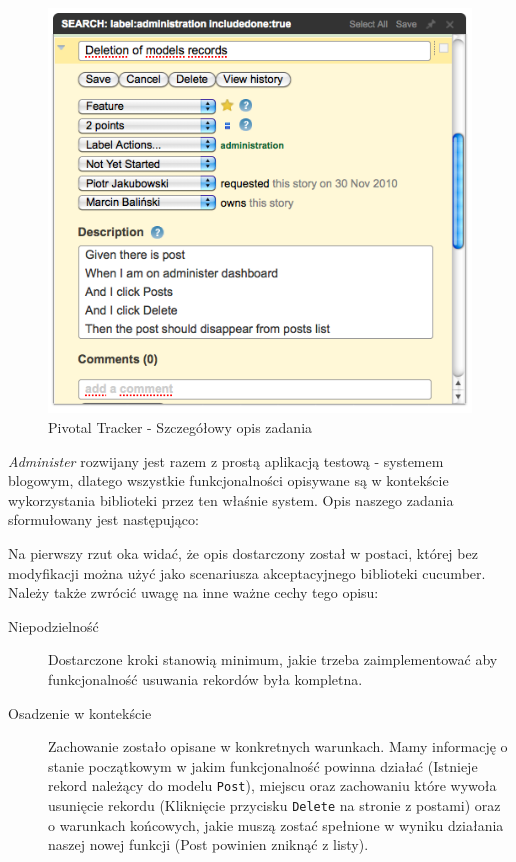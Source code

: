     \vspace{5 mm}
    \begin{figure}[h]
  		\begin{center}
  			\includegraphics[width=0.8\linewidth]{images/administer_story_desc.png}
  			\caption{Pivotal Tracker - Szczegółowy opis zadania}
  			\label{administer_story_desc}
  		\end{center}
  	\end{figure}
    
    \emph{Administer} rozwijany jest razem z prostą aplikacją testową - systemem blogowym, dlatego wszystkie funkcjonalności opisywane są w kontekście wykorzystania biblioteki przez ten właśnie system. Opis naszego zadania sformułowany jest następująco:
    
    
    
    Na pierwszy rzut oka widać, że opis dostarczony został w postaci, której bez modyfikacji można użyć jako scenariusza akceptacyjnego biblioteki cucumber. Należy także zwrócić uwagę na inne ważne cechy tego opisu:
    
    \begin{description}
      \item[Niepodzielność] Dostarczone kroki stanowią minimum, jakie trzeba zaimplementować aby funkcjonalność usuwania rekordów była kompletna.
      \item[Osadzenie w kontekście] Zachowanie zostało opisane w konkretnych warunkach. Mamy informację o stanie początkowym w jakim funkcjonalność powinna działać (Istnieje rekord należący do modelu \texttt{Post}), miejscu oraz zachowaniu które wywoła usunięcie rekordu (Kliknięcie przycisku \texttt{Delete} na stronie z postami) oraz o warunkach końcowych, jakie muszą zostać spełnione w wyniku działania naszej nowej funkcji (Post powinien zniknąć z listy).
    \end{description}
  	
